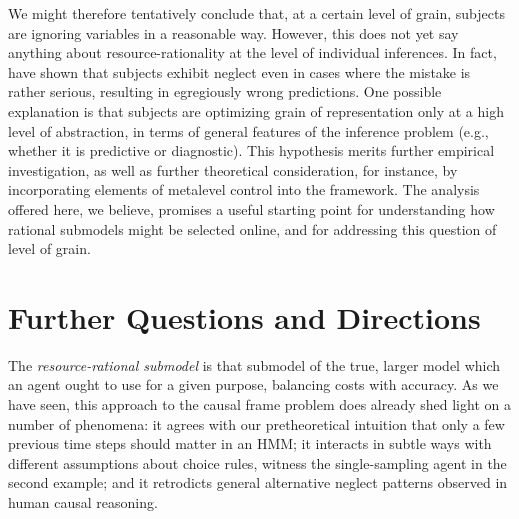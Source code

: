 \documentclass[10pt,letterpaper]{article}
\begin{document}

We might therefore tentatively conclude that, at a certain level of grain, subjects are ignoring variables in a reasonable way. 
However, this does not yet say anything about resource-rationality at the level of individual inferences. In fact, \cite{Fernbach2013} have shown that subjects exhibit neglect even in cases where the mistake is rather serious, resulting in egregiously wrong predictions. One possible explanation is that subjects are optimizing grain of representation only at a high level of abstraction, in terms of general features of the inference problem (e.g., whether it is predictive or diagnostic). This hypothesis merits further empirical investigation, as well as further theoretical consideration, for instance, by incorporating elements of metalevel control \citep{Icard2014,Lieder2014} into the framework. The analysis offered here, we believe, promises a useful starting point for understanding how rational submodels might be selected online, and for addressing this question of level of grain.

\section{Further Questions and Directions}

The \emph{resource-rational submodel} is that submodel of the true, larger model which an agent ought to use for a given purpose, balancing costs with accuracy. 
As we have seen, this approach to the causal frame problem does already shed light on a number of phenomena: it agrees with our pretheoretical intuition that only a few previous time steps should matter in an HMM; it interacts in subtle ways with different assumptions about choice rules, witness the single-sampling agent in the second example; and it retrodicts general alternative neglect patterns observed in human causal reasoning.
\end{document}
